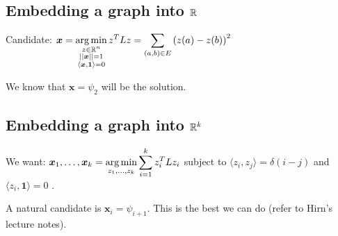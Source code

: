 \documentclass[11pt,letterpaper]{article}
\begin{document}
\subsection{Embedding a graph into $\mathbb{R}$}

Candidate: $\displaystyle \bm{x}=\operatorname*{arg\,min}_{\substack{z \in \mathbb{R}^n\\ ||\bm{x}||=1\\ \langle \bm{x}, \bm{1}\rangle=0}} z^T L z = \sum_{(a,b)\in E} \left(z(a) - z(b)\right)^2$

We know that $\bm{x} = \psi_2$ will be the solution.

\subsection{Embedding a graph into $\mathbb{R}^k$}

We want: $\displaystyle \bm{x}_1,\ldots,\bm{x}_k = \operatorname*{arg\,min}_{z_1,\ldots,z_k}\sum_{i=1}^k z_i^T L z_i$
subject to $\langle z_i, z_j\rangle = \delta(i-j)$ and $\langle z_i,\bm{1}\rangle = 0$ .

A natural candidate is $\bm{x}_i=\psi_{i+1}$. This is the best we can do (refer to Hirn's lecture notes).
\end{document}
